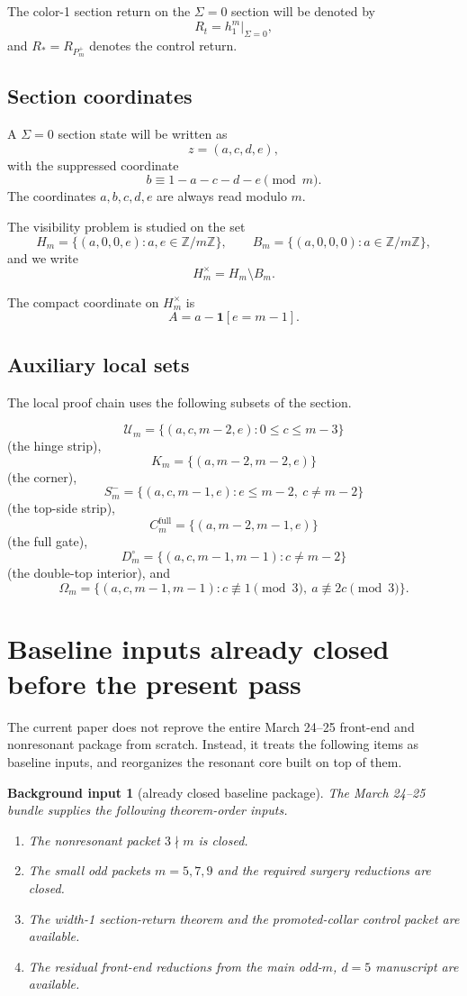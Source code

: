\documentclass[11pt]{article}
\newtheorem{background}[theorem]{Background input}
\newcommand{\Z}{\mathbb Z}
\newcommand{\1}{\mathbf 1}
\newcommand{\Hm}{H_m}
\newcommand{\Bm}{B_m}
\newcommand{\Hmx}{H_m^\times}
\newcommand{\Um}{\mathcal U_m}
\newcommand{\Om}{\Omega_m}
\newcommand{\Dt}{D_m^\circ}
\begin{document}
The color-1 section return on the \(\Sigma=0\) section will be denoted by
\[
R_t=h_1^m\big|_{\Sigma=0},
\]
and \(R_*=R_{P_m^+}\) denotes the control return.

\subsection{Section coordinates}

A \(\Sigma=0\) section state will be written as
\[
z=(a,c,d,e),
\]
with the suppressed coordinate
\[
b \equiv 1-a-c-d-e \pmod m.
\]
The coordinates \(a,b,c,d,e\) are always read modulo \(m\).

The visibility problem is studied on the set
\[
\Hm=\{(a,0,0,e): a,e\in \Z/m\Z\},
\qquad
\Bm=\{(a,0,0,0): a\in \Z/m\Z\},
\]
and we write
\[
\Hmx=\Hm\setminus \Bm.
\]

The compact coordinate on \(\Hmx\) is
\[
A=a-\1[e=m-1].
\]

\subsection{Auxiliary local sets}

The local proof chain uses the following subsets of the section.

\[
\Um=\{(a,c,m-2,e): 0\le c\le m-3\}
\]
(the hinge strip),
\[
K_m=\{(a,m-2,m-2,e)\}
\]
(the corner),
\[
S_m^-=\{(a,c,m-1,e): e\le m-2,\ c\ne m-2\}
\]
(the top-side strip),
\[
C_m^{\mathrm{full}}=\{(a,m-2,m-1,e)\}
\]
(the full gate),
\[
\Dt=\{(a,c,m-1,m-1): c\ne m-2\}
\]
(the double-top interior),
and
\[
\Om
=
\{(a,c,m-1,m-1):
c\not\equiv 1 \pmod 3,\ 
a\not\equiv 2c \pmod 3\}.
\]

\section{Baseline inputs already closed before the present pass}

The current paper does not reprove the entire March 24--25 front-end and nonresonant package from scratch.
Instead, it treats the following items as baseline inputs, and reorganizes the resonant core built on top of them.

\begin{background}[already closed baseline package]
The March 24--25 bundle supplies the following theorem-order inputs.
\begin{enumerate}[label=\textup{(\arabic*)},leftmargin=2.8em]
\item The nonresonant packet \(3\nmid m\) is closed.
\item The small odd packets \(m=5,7,9\) and the required surgery reductions are closed.
\item The width-1 section-return theorem and the promoted-collar control packet are available.
\item The residual front-end reductions from the main odd-\(m\), \(d=5\) manuscript are available.
\end{enumerate}
\end{background}
\end{document}

